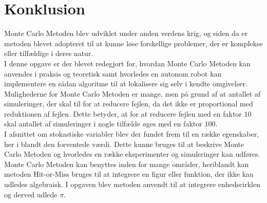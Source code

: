 \documentclass[../../SRP.tex]{subfiles}
\begin{document}
\chapter{Konklusion}
Monte Carlo Metoden blev udviklet under anden verdens krig, og siden da er metoden blevet adopteret til at kunne løse forskellige problemer, der er komplekse eller tilfældige i deres natur.  \\

I denne opgave er der blevet redegjort for, hvordan Monte Carlo Metoden kan anvendes i praksis og teoretisk samt hvorledes en autonom robot kan implementere en sådan algoritme til at lokalisere sig selv i kendte omgivelser. Mulighederne for Monte Carlo Metoden er mange, men på grund af at antallet af simuleringer, der skal til for at reducere fejlen, da det ikke er proportional med reduktionen af fejlen. Dette betyder, at for at reducere fejlen med en faktor $10$ skal antallet af simuleringer i nogle tilfælde øges med en faktor $100$. \\

I afsnittet om stokastiske variabler blev der fundet frem til en række egenskaber, her i blandt den forventede værdi. Dette kunne bruges til at beskrive Monte Carlo Metoden og hvorledes en række eksperimenter og simuleringer kan udføres. \\

Monte Carlo Metoden kan benyttes inden for mange områder, heriblandt kan metoden Hit-or-Miss bruges til at integrere en figur eller funktion, der ikke kan udledes algebraisk. I opgaven blev metoden anvendt til at integrere enhedscirklen og derved udlede $\pi$. \\
\end{document}
